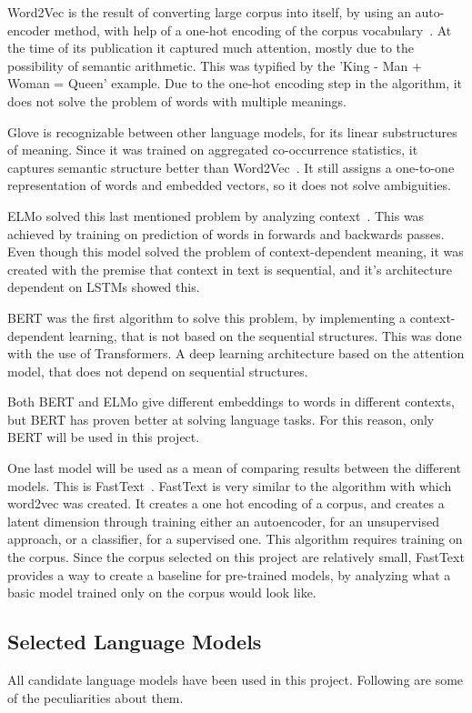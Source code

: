 Word2Vec is the result of converting large corpus into itself, by using an auto-encoder method, with help of a one-hot encoding of the corpus vocabulary~\cite{mikolov2013word2vec}. At the time of its publication it captured much attention, mostly due to the possibility of semantic arithmetic. This was typified by the 'King - Man + Woman = Queen' example. Due to the one-hot encoding step in the algorithm, it does not solve the problem of words with multiple meanings.

Glove is recognizable between other language models, for its linear substructures of meaning. Since it was trained on aggregated co-occurrence statistics, it captures semantic structure better than Word2Vec~\cite{penningto2014glove}.
It still assigns a one-to-one representation of words and embedded vectors, so it does not solve ambiguities.

ELMo solved this last mentioned problem by analyzing context~\cite{peters2018elmo}.
This was achieved by training on prediction of words in forwards and backwards passes. Even though this model solved the problem of context-dependent meaning, it was created with the premise that context in text is sequential, and it's architecture dependent on LSTMs showed this.

BERT was the first algorithm to solve this problem, by implementing a context-dependent learning, that is not based on the sequential structures. This was done with the use of Transformers. A deep learning architecture based on the attention model, that does not depend on sequential structures.

Both BERT and ELMo give different embeddings to words in different contexts, but BERT has proven better at solving language tasks. For this reason, only BERT will be used in this project.

One last model will be used as a mean of comparing results between the different models. This is FastText~\cite{joulin2017fasttext}. FastText is very similar to the algorithm with which word2vec was created. It creates a one hot encoding of a corpus, and creates a latent dimension through training either an autoencoder, for an unsupervised approach, or a classifier, for a supervised one. This algorithm requires training on the corpus. Since the corpus selected on this project are relatively small, FastText provides a way to create a baseline for pre-trained models, by analyzing what a basic model trained only on the corpus would look like.

\subsection{Selected Language Models}\label{sub:Selected Language Models}
All candidate language models have been used in this project. Following are some of the peculiarities about them.

